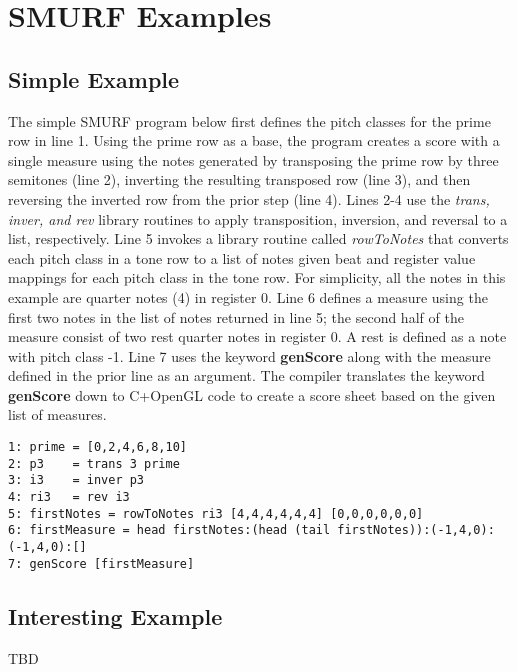 \section{SMURF Examples}

\subsection{Simple Example}
The simple SMURF program below first defines the pitch classes for the prime row in line 1. Using the prime row as a base, the program creates a score with a single measure using the notes generated by transposing the prime row by three semitones (line 2), inverting the resulting transposed row (line 3), and then reversing the inverted row from the prior step (line 4). Lines 2-4 use the \emph{trans, inver, and rev} library routines to apply transposition, inversion, and reversal to a list, respectively. Line 5 invokes a library routine called \emph{rowToNotes} that converts each pitch class in a tone row to a list of notes given beat and register value mappings for each pitch class in the tone row. For simplicity, all the notes in this example are quarter notes (4) in register 0. Line 6 defines a measure using the first two notes in the list of notes returned in line 5; the second half of the measure consist of two rest quarter notes in register 0. A rest is defined as a note with pitch class -1.  Line 7 uses the keyword \textbf{genScore} along with the measure defined in the prior line as an argument. The compiler translates the keyword \textbf{genScore} down to C+OpenGL code to create a score sheet based on the given list of measures.     

\begin{verbatim}
1: prime = [0,2,4,6,8,10]
2: p3    = trans 3 prime
3: i3    = inver p3
4: ri3   = rev i3
5: firstNotes = rowToNotes ri3 [4,4,4,4,4,4] [0,0,0,0,0,0]
6: firstMeasure = head firstNotes:(head (tail firstNotes)):(-1,4,0):(-1,4,0):[]
7: genScore [firstMeasure]
\end{verbatim}

\subsection{Interesting Example}

TBD
